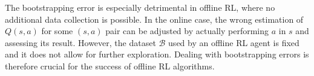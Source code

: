 The bootstrapping error is especially detrimental in offline RL, where
no additional data collection is possible. In the online case, the
wrong estimation of $Q\left(s,a\right)$ for some $\left(s,a\right)$
pair can be adjusted by actually performing $a$ in $s$ and assessing
its result. However, the dataset $\mathcal{B}$ used by an offline RL
agent is fixed and it does not allow for further exploration. Dealing
with bootstrapping errors is therefore crucial for the success of
offline RL algorithms.

